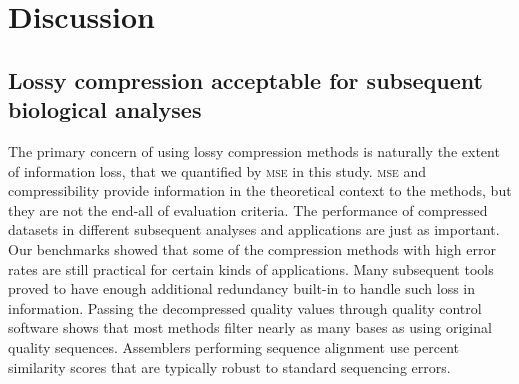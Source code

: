 \documentclass{bioinfo}
\begin{document}


\section{Discussion}

\subsection{Lossy compression acceptable for subsequent biological analyses}

The primary concern of using lossy compression methods is naturally
the extent of information loss, that we quantified by \textsc{mse} in
this study. \textsc{mse} and compressibility provide information in
the theoretical context to the methods, but they are not the end-all
of evaluation criteria. The performance of compressed datasets in
different subsequent analyses and applications are just as
important. Our benchmarks showed that some of the compression methods
with high error rates are still practical for certain kinds of
applications. Many subsequent tools proved to have enough additional
redundancy built-in to handle such loss in information. Passing the
decompressed quality values through quality control software shows
that most methods filter nearly as many bases as using original
quality sequences. Assemblers performing sequence alignment use
percent similarity scores that are typically robust to standard
sequencing errors.
\end{document}
